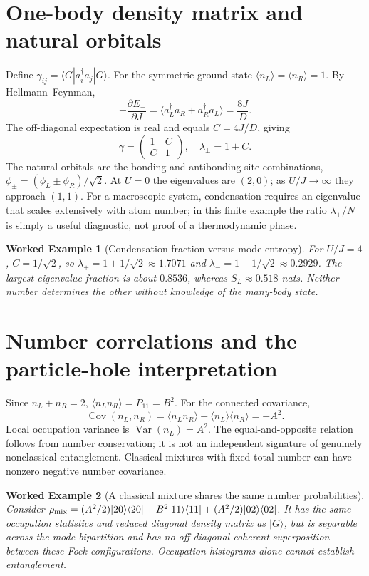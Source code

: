 \documentclass[11pt,a4paper]{article}
\newtheorem{example}{Worked Example}
\begin{document}
\section{One-body density matrix and natural orbitals}
Define $\gamma_{ij}=\langle G|a_i^\dagger a_j|G\rangle$. For the symmetric ground state $\langle n_L\rangle=\langle n_R\rangle=1$. By Hellmann--Feynman,
\begin{equation}-\frac{\partial E_-}{\partial J}=\langle a_L^\dagger a_R+a_R^\dagger a_L\rangle=\frac{8J}{D}.\end{equation}
The off-diagonal expectation is real and equals $C=4J/D$, giving
\begin{equation}\boxed{\gamma=\begin{pmatrix}1&C\\C&1\end{pmatrix},\quad\lambda_\pm=1\pm C.}\end{equation}
The natural orbitals are the bonding and antibonding site combinations, $\phi_\pm=(\phi_L\pm\phi_R)/\sqrt2$. At $U=0$ the eigenvalues are $(2,0)$; as $U/J\to\infty$ they approach $(1,1)$. For a macroscopic system, condensation requires an eigenvalue that scales extensively with atom number; in this finite example the ratio $\lambda_+/N$ is simply a useful diagnostic, not proof of a thermodynamic phase.
\begin{example}[Condensation fraction versus mode entropy]
For $U/J=4$, $C=1/\sqrt2$, so $\lambda_+=1+1/\sqrt2\approx1.7071$ and $\lambda_-=1-1/\sqrt2\approx0.2929$. The largest-eigenvalue fraction is about $0.8536$, whereas $S_L\approx0.518$ nats. Neither number determines the other without knowledge of the many-body state.
\end{example}
\section{Number correlations and the particle-hole interpretation}
Since $n_L+n_R=2$, $\langle n_Ln_R\rangle=P_{11}=B^2$. For the connected covariance,
\begin{equation}\boxed{\operatorname{Cov}(n_L,n_R)=\langle n_Ln_R\rangle-\langle n_L\rangle\langle n_R\rangle=-A^2.}\end{equation}
Local occupation variance is $\operatorname{Var}(n_L)=A^2$. The equal-and-opposite relation follows from number conservation; it is not an independent signature of genuinely nonclassical entanglement. Classical mixtures with fixed total number can have nonzero negative number covariance.
\begin{example}[A classical mixture shares the same number probabilities]
Consider $\rho_{\rm mix}=(A^2/2)|20\rangle\langle20|+B^2|11\rangle\langle11|+(A^2/2)|02\rangle\langle02|$. It has the same occupation statistics and reduced diagonal density matrix as $|G\rangle$, but is separable across the mode bipartition and has no off-diagonal coherent superposition between these Fock configurations. Occupation histograms alone cannot establish entanglement.
\end{example}
\end{document}
